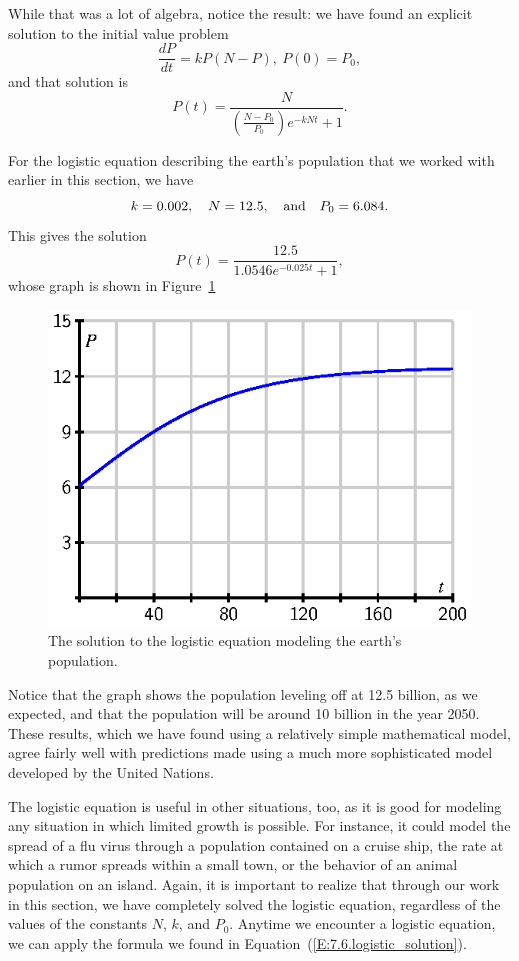 While that was a lot of algebra, notice the result:  we have
found an explicit solution to the initial value problem
$$
  \frac{dP}{dt} = kP(N-P), \ P(0) = P_0,
$$
and that solution is 
\begin{equation}\label{E:7.6.logistic_solution}
P(t) = \frac{N}{\left(\frac{N-P_0}{P_0}\right) e^{-kNt} + 1}.
\end{equation}

For the logistic equation describing the earth's population that we worked with earlier in this section, we have
$$k=0.002, \quad N= 12.5, \quad \hbox{and} \quad P_0 = 6.084.$$
This gives the solution
$$
P(t) = \frac{12.5}{1.0546e^{-0.025t} + 1},
$$
whose graph is shown in Figure~\ref{F:7.6.logistic_sol}
\begin{figure}[h]
\begin{center}
  \includegraphics{figures/7_6_logistic_sol.eps}
\end{center}
\caption{The solution to the logistic equation modeling the earth's population.} \label{F:7.6.logistic_sol}
\end{figure}
Notice that the graph shows the population leveling off at 12.5 billion, as
we expected, and that the population will be around 10 billion in the
year 2050.  These results, which we have found using a relatively simple
mathematical model, agree fairly well with predictions made using a
much more sophisticated model developed by the United Nations.

The logistic equation is useful in other situations, too, as it is good for modeling any situation in which limited growth is possible.  For instance, it could model the spread of a flu virus through a population contained on a cruise ship, the rate at which a rumor spreads within a small town, or the behavior of an animal population on an island.  Again, it is important to realize that through our work in this section, we have completely solved the logistic equation, regardless of the values of the constants $N$, $k$, and $P_0$.  Anytime we encounter a logistic equation, we can apply the formula we found in Equation~(\ref{E:7.6.logistic_solution}).

